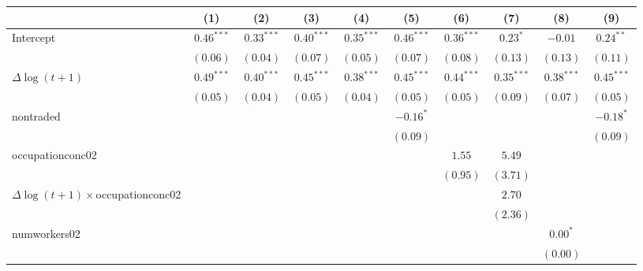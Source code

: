 
\begin{tabular}{l c c c c c c c c c }
\hline
 & (1) & (2) & (3) & (4) & (5) & (6) & (7) & (8) & (9) \\
\hline
Intercept          & $0.46^{***}$ & $0.33^{***}$ & $0.40^{***}$ & $0.35^{***}$ & $0.46^{***}$ & $0.36^{***}$ & $0.23^{*}$   & $-0.01$      & $0.24^{**}$  \\
                     & $(0.06)$     & $(0.04)$     & $(0.07)$     & $(0.05)$     & $(0.07)$     & $(0.08)$     & $(0.13)$     & $(0.13)$     & $(0.11)$     \\
$\Delta \log(t+1)$              & $0.49^{***}$ & $0.40^{***}$ & $0.45^{***}$ & $0.38^{***}$ & $0.45^{***}$ & $0.44^{***}$ & $0.35^{***}$ & $0.38^{***}$ & $0.45^{***}$ \\
                     & $(0.05)$     & $(0.04)$     & $(0.05)$     & $(0.04)$     & $(0.05)$     & $(0.05)$     & $(0.09)$     & $(0.07)$     & $(0.05)$     \\
nontraded            &              &              &              &              & $-0.16^{*}$  &              &              &              & $-0.18^{*}$  \\
                     &              &              &              &              & $(0.09)$     &              &              &              & $(0.09)$     \\
occupationconc02           &              &              &              &              &              & $1.55$       & $5.49$       &              &              \\
                     &              &              &              &              &              & $(0.95)$     & $(3.71)$     &              &              \\
$\Delta \log(t+1) \times$occupationconc02   &              &              &              &              &              &              & $2.70$       &              &              \\
                     &              &              &              &              &              &              & $(2.36)$     &              &              \\
numworkers02         &              &              &              &              &              &              &              & $0.00^{*}$   &              \\
                     &              &              &              &              &              &              &              & $(0.00)$     &              \\

\end{tabular}
